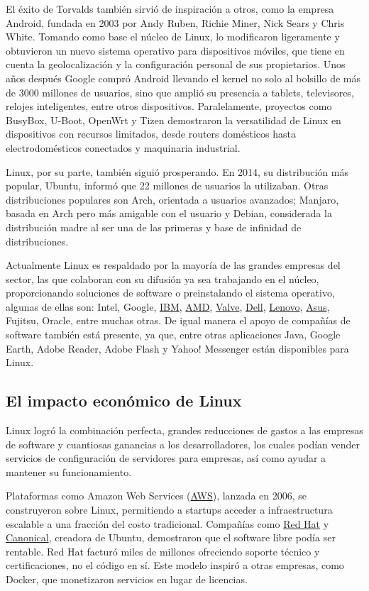 \documentclass[a4paper,12pt]{article}
\begin{document}
El éxito de Torvalds también sirvió de inspiración a otros, como la empresa
Android, fundada en 2003 por Andy Ruben, Richie Miner, Nick Sears y Chris White.
Tomando como base el núcleo de Linux, lo modificaron ligeramente y obtuvieron un
nuevo sistema operativo para dispositivos móviles, que tiene en cuenta la
geolocalización y la configuración personal de sus propietarios. Unos años 
después Google compró Android llevando el kernel no solo al bolsillo de más de
3000 millones de usuarios, sino que amplió su presencia a tablets, televisores,
relojes inteligentes, entre otros dispositivos. Paralelamente, proyectos como
BusyBox, U-Boot, OpenWrt y Tizen demostraron la versatilidad de Linux en
dispositivos con recursos limitados, desde routers domésticos hasta 
electrodomésticos conectados y maquinaria industrial.

Linux, por su parte, también siguió prosperando. En 2014, su distribución más
popular, Ubuntu, informó que 22 millones de usuarios la utilizaban. Otras
distribuciones populares son Arch, orientada a usuarios avanzados; Manjaro,
basada en Arch pero más amigable con el usuario y Debian, considerada la 
distribución madre al ser una de las primeras y base de infinidad de
distribuciones. 

Actualmente Linux es respaldado por la mayoría de las grandes empresas del
sector, las que colaboran con su difusión ya sea trabajando en el núcleo,
proporcionando soluciones de software o preinstalando el sistema operativo,
algunas de ellas son: Intel, Google, \hyperlink{ibm}{IBM}, \hyperlink{amd}{AMD}, \hyperlink{valve}{Valve}, \hyperlink{dell}{Dell}, \hyperlink{lenovo}{Lenovo}, \hyperlink{asus}{Asus},
Fujitsu, Oracle, entre muchas otras. De igual manera el apoyo de compañías de
software también está presente, ya que, entre otras aplicaciones Java, Google
Earth, Adobe Reader, Adobe Flash y Yahoo! Messenger están disponibles para
Linux.  

\subsection{El impacto económico de Linux}

Linux logró la combinación perfecta, grandes reducciones de gastos a las
empresas de software y cuantiosas ganancias a los desarrolladores, los cuales
podían vender servicios de configuración de servidores para empresas, así como
ayudar a mantener su funcionamiento. 

Plataformas como Amazon Web Services (\hyperlink{aws}{AWS}), lanzada en 2006, se construyeron
sobre Linux, permitiendo a startups acceder a infraestructura escalable a una
fracción del costo tradicional. Compañías como \hyperlink{redhat}{Red Hat} y \hyperlink{canonical}{Canonical}, creadora de
Ubuntu, demostraron que el software libre podía ser rentable. Red Hat facturó
miles de millones ofreciendo soporte técnico y certificaciones, no el código en
sí. Este modelo inspiró a otras empresas, como Docker, que monetizaron servicios
en lugar de licencias.
\end{document}
